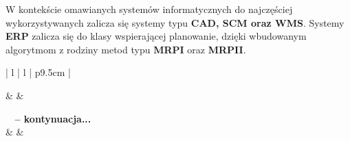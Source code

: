 		W kontekście omawianych systemów informatycznych do najczęściej wykorzystywanych zalicza się systemy typu
		\textbf{CAD, SCM oraz WMS}. Systemy \textbf{ERP} zalicza się do klasy wspierającej planowanie, dzięki 
		wbudowanym algorytmom z rodziny metod typu \textbf{MRPI} oraz \textbf{MRPII}.
		
		\begin{center}
			\begin{longtable}{| l | l | p{9.5cm} |}
			
					\hline
							& 
							&
							\\
					\hline
					\endfirsthead
					
					{{\bfseries \tablename\ \thetable{} -- kontynuacja...}} \\
					\hline 
							& 
							&
							\\
					\hline 
					\endhead	
					
					\hline
						 \\ \hline
					\endfoot
	
					\hline \hline
					\endlastfoot			
					

\end{longtable}
\end{center}
